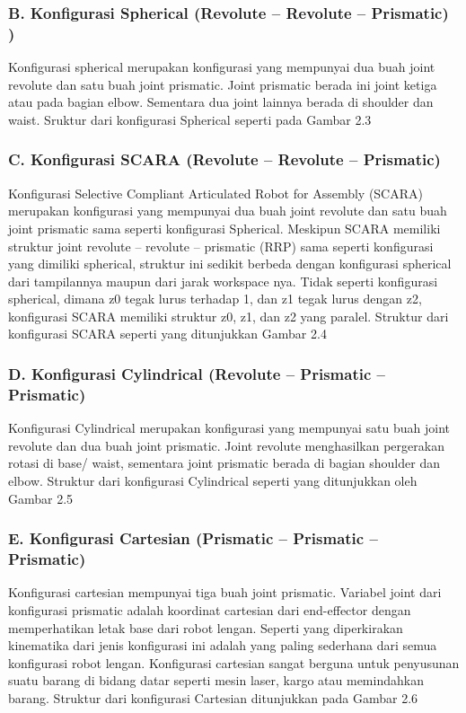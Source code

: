 \subsubsection{B. Konfigurasi Spherical (Revolute – Revolute – Prismatic)   )} 

Konfigurasi spherical merupakan konfigurasi yang mempunyai dua buah joint revolute dan satu buah joint prismatic. Joint prismatic berada ini joint ketiga atau pada bagian elbow. Sementara dua joint lainnya berada di shoulder dan waist. Sruktur dari konfigurasi Spherical seperti pada Gambar 2.3

\subsubsection{C. Konfigurasi SCARA (Revolute – Revolute – Prismatic) } 

Konfigurasi Selective Compliant Articulated Robot for Assembly (SCARA) merupakan konfigurasi yang mempunyai dua buah joint revolute dan satu buah joint prismatic sama seperti konfigurasi Spherical. Meskipun SCARA memiliki struktur joint revolute – revolute – prismatic (RRP) sama seperti konfigurasi yang dimiliki spherical, struktur ini sedikit berbeda dengan konfigurasi spherical dari tampilannya maupun dari jarak workspace nya. Tidak seperti konfigurasi spherical, dimana z0 tegak lurus terhadap 1, dan z1 tegak lurus dengan z2, konfigurasi SCARA memiliki struktur z0, z1, dan z2 yang paralel. Struktur dari konfigurasi SCARA seperti yang ditunjukkan Gambar 2.4

\subsubsection{D. Konfigurasi Cylindrical (Revolute – Prismatic – Prismatic) } 

Konfigurasi Cylindrical merupakan konfigurasi yang mempunyai satu buah joint revolute dan dua buah joint prismatic. Joint revolute menghasilkan pergerakan rotasi di base/ waist, sementara joint prismatic berada di bagian shoulder dan elbow. Struktur dari konfigurasi Cylindrical seperti yang ditunjukkan oleh Gambar 2.5

\subsubsection{E. Konfigurasi Cartesian (Prismatic – Prismatic – Prismatic)  } 

Konfigurasi cartesian mempunyai tiga buah joint prismatic. Variabel joint dari konfigurasi prismatic adalah koordinat cartesian dari end-effector dengan memperhatikan letak base dari robot lengan. Seperti yang diperkirakan kinematika dari jenis konfigurasi ini adalah yang paling sederhana dari semua konfigurasi robot lengan. Konfigurasi cartesian sangat berguna untuk penyusunan suatu barang di bidang datar seperti mesin laser, kargo atau memindahkan barang. Struktur dari konfigurasi Cartesian ditunjukkan pada Gambar 2.6

